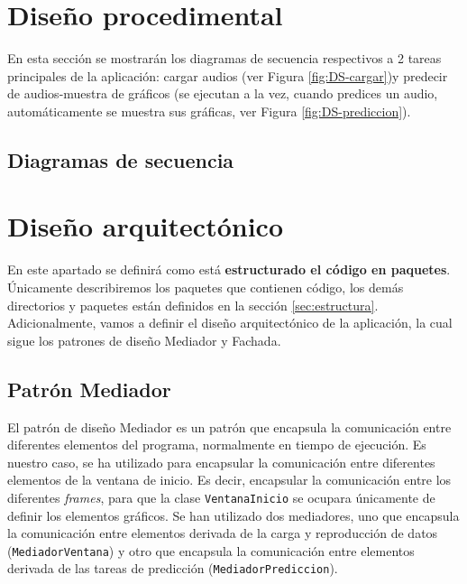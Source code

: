 \section{Diseño procedimental}
En esta sección se mostrarán los diagramas de secuencia respectivos a 2 tareas principales de la aplicación: cargar audios (ver Figura \ref{fig:DS-cargar})y predecir de audios-muestra de gráficos (se ejecutan a la vez, cuando predices un audio, automáticamente se muestra sus gráficas, ver Figura \ref{fig:DS-prediccion}).
\subsection{Diagramas de secuencia}



\section{Diseño arquitectónico}
En este apartado se definirá como está \textbf{estructurado el código en paquetes}. Únicamente describiremos los paquetes que contienen código, los demás directorios y paquetes están definidos en la sección \ref{sec:estructura}. Adicionalmente, vamos a definir el diseño arquitectónico de la aplicación, la cual sigue los patrones de diseño Mediador y Fachada.

\subsection{Patrón Mediador}
El patrón de diseño Mediador es un patrón que encapsula la comunicación entre diferentes elementos del programa, normalmente en tiempo de ejecución. \cite{wiki:mediador} Es nuestro caso, se ha utilizado para encapsular la comunicación entre diferentes elementos de la ventana de inicio. Es decir, encapsular la comunicación entre los diferentes \textit{frames}, para que la clase \texttt{VentanaInicio} se ocupara únicamente de definir los elementos gráficos. Se han utilizado dos mediadores, uno que encapsula la comunicación entre elementos derivada de la carga y reproducción de datos (\texttt{MediadorVentana}) y otro que encapsula la comunicación entre elementos derivada de las tareas de predicción (\texttt{MediadorPrediccion}).

